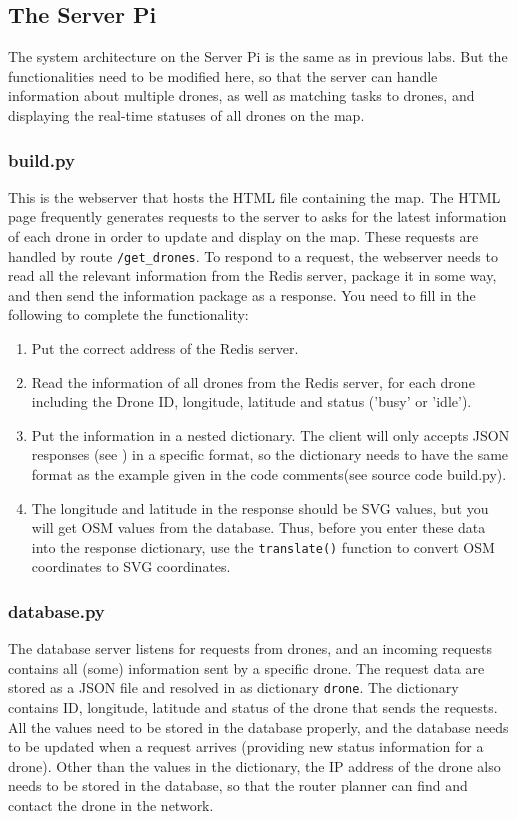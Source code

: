 \documentclass{article}
\begin{document}
\subsection{The Server Pi}
The system architecture on the Server Pi is the same as in previous labs. But the functionalities need to be modified here, so that the server can handle information about multiple drones, as well as matching tasks to drones, and displaying the real-time statuses of all drones on the map.

\subsubsection{build.py}
This is the webserver that hosts the HTML file containing the map. The HTML page frequently generates requests to the server to asks for the latest information of each drone in order to update and display on the map. These requests are handled by route \verb!/get_drones!. To respond to a request, the webserver needs to read all the relevant information from the Redis server, package it in some way, and then send the information package as a response. You need to fill in the following to complete the functionality:
\begin{enumerate}
    \item Put the correct address of the Redis server.
    \item Read the information of all drones from the Redis server, for each drone including the Drone ID, longitude, latitude and status ('busy' or 'idle').
    \item Put the information in a nested dictionary. The client will only accepts JSON responses (see \cite{json}) in a specific format, so the dictionary needs to have the same format as the example given in the code comments(see source code build.py).
    \item The longitude and latitude in the response should be SVG values, but you will get OSM values from the database. Thus, before you enter these data into the response dictionary, use the \verb!translate()! function to convert OSM coordinates to SVG coordinates.
\end{enumerate}

\subsubsection{database.py}
The database server listens for requests from drones, and an incoming requests contains all (some) information sent by a specific drone. The request data are stored as a JSON file and resolved in as dictionary \verb!drone!. The dictionary contains ID, longitude, latitude and status of the drone that sends the requests. All the values need to be stored in the database properly, and the database needs to be updated when a request arrives (providing new status information for a drone). Other than the values in the dictionary, the IP address of the drone also needs to be stored in the database, so that the router planner can find and contact the drone in the network.
\end{document}
